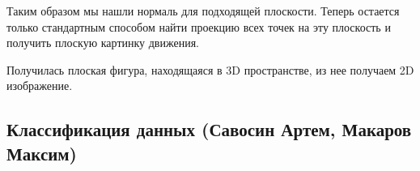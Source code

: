Таким образом мы нашли нормаль для подходящей плоскости. Теперь остается только стандартным способом найти проекцию всех точек на эту плоскость и получить плоскую картинку движения.
\begin{figure}[H]
\end{figure}
Получилась плоская фигура, находящаяся в 3D пространстве, из нее получаем 2D изображение.
\begin{figure}[H]
\end{figure}
\subsection{Классификация данных (Савосин Артем, Макаров Максим)}


